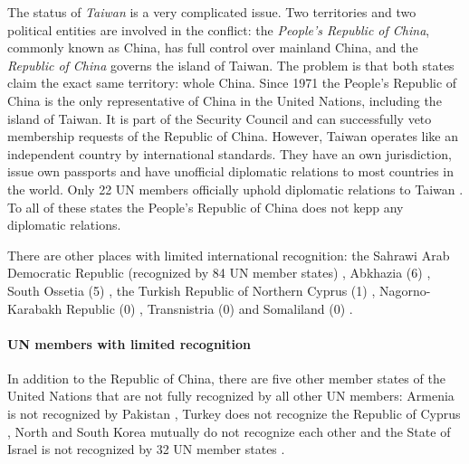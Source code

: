 The status of \emph{Taiwan} is a very complicated issue. Two territories and two political entities are involved in the conflict: the \emph{People's Republic of China}, commonly known as China, has full control over mainland China, and the \emph{Republic of China} governs the island of Taiwan. The problem is that both states claim the exact same territory: whole China. Since 1971 the People's Republic of China is the only representative of China in the United Nations, including the island of Taiwan. It is part of the Security Council and can successfully veto membership requests of the Republic of China. However, Taiwan operates like an independent country by international standards. They have an own jurisdiction, issue own passports and have unofficial diplomatic relations to most countries in the world. Only 22 UN members officially uphold diplomatic relations to Taiwan \cite{TaiwanRecognition}. To all of these states the People's Republic of China does not kepp any diplomatic relations.

There are other places with limited international recognition: the Sahrawi Arab Democratic Republic (recognized by 84 UN member states) \cite{WesternSaharaRecognition}, Abkhazia (6) \cite{AbkhaziaRecognition}, South Ossetia (5) \cite{SouthOssetiaRecognition}, the Turkish Republic of Northern Cyprus (1) \cite{NorthernCyprusRecognition}, Nagorno-Karabakh Republic (0) \cite{NagornoRecognition}, Transnistria (0) \cite{TransnistriaRecognition} and Somaliland (0) \cite{SomalilandRecognition}.


\paragraph{UN members with limited recognition} %
\label{par:un_members_with_limited_recognition}

In addition to the Republic of China, there are five other member states of the United Nations that are not fully recognized by all other UN members: Armenia is not recognized by Pakistan \cite{ArmeniaRecognition}, Turkey does not recognize the Republic of Cyprus \cite{CyprusRecognition}, North and South Korea mutually do not recognize each other \cite{KoreaRecognition} and the State of Israel is not recognized by 32 UN member states \cite{IsraelRecognition}.


